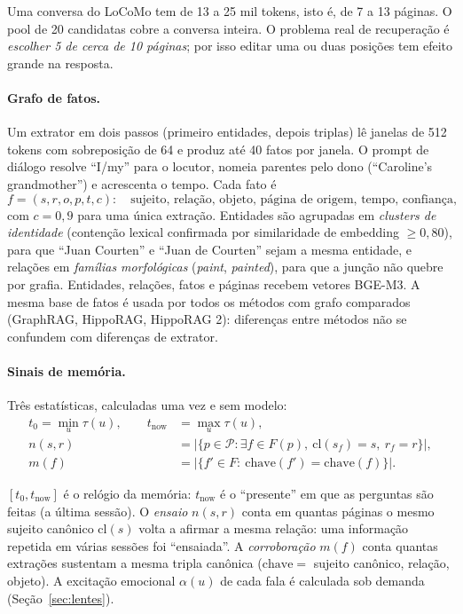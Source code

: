 \documentclass[11pt]{article}
\begin{document}
\begin{exemplo}
Uma conversa do LoCoMo tem de 13 a 25 mil tokens, isto é, de 7 a 13 páginas.
O pool de 20 candidatas cobre a conversa inteira. O problema real de
recuperação é \emph{escolher 5 de cerca de 10 páginas}; por isso editar uma
ou duas posições tem efeito grande na resposta.
\end{exemplo}

\paragraph{Grafo de fatos.}
Um extrator em dois passos (primeiro entidades, depois triplas) lê janelas de
512 tokens com sobreposição de 64 e produz até 40 fatos por janela. O prompt
de diálogo resolve ``I/my'' para o locutor, nomeia parentes pelo dono
(``Caroline's grandmother'') e acrescenta o tempo. Cada fato é
\[
f=(s,r,o,p,t,c):\quad\text{sujeito, relação, objeto, página de origem, tempo, confiança},
\]
com $c=0{,}9$ para uma única extração. Entidades são agrupadas em
\emph{clusters de identidade} (contenção lexical confirmada por similaridade
de embedding $\ge0{,}80$), para que ``Juan Courten'' e ``Juan de Courten''
sejam a mesma entidade, e relações em \emph{famílias morfológicas}
(\emph{paint}, \emph{painted}), para que a junção não quebre por grafia.
Entidades, relações, fatos e páginas recebem vetores BGE-M3. A mesma base de
fatos é usada por todos os métodos com grafo comparados (GraphRAG, HippoRAG,
HippoRAG 2): diferenças entre métodos não se confundem com diferenças de
extrator.

\paragraph{Sinais de memória.}
Três estatísticas, calculadas uma vez e sem modelo:
\begin{align}
t_0=\min_u\tau(u),\qquad t_{\text{now}}&=\max_u\tau(u), \label{eq:relogio}\\
n(s,r)&=\bigl|\{p\in\mathcal{P}:\exists f\in F(p),\ \mathrm{cl}(s_f)=s,\ r_f=r\}\bigr|, \label{eq:ensaio}\\
m(f)&=\bigl|\{f'\in F:\ \mathrm{chave}(f')=\mathrm{chave}(f)\}\bigr|. \label{eq:corroboracao}
\end{align}

\begin{empalavras}
$[t_0,t_{\text{now}}]$ é o relógio da memória: $t_{\text{now}}$ é o
``presente'' em que as perguntas são feitas (a última sessão). O
\emph{ensaio} $n(s,r)$ conta em quantas páginas o mesmo sujeito canônico
$\mathrm{cl}(s)$ volta a afirmar a mesma relação: uma informação repetida em
várias sessões foi ``ensaiada''. A \emph{corroboração} $m(f)$ conta quantas
extrações sustentam a mesma tripla canônica
($\mathrm{chave}=$ sujeito canônico, relação, objeto). A excitação emocional
$\alpha(u)$ de cada fala é calculada sob demanda (Seção~\ref{sec:lentes}).
\end{empalavras}
\end{document}
